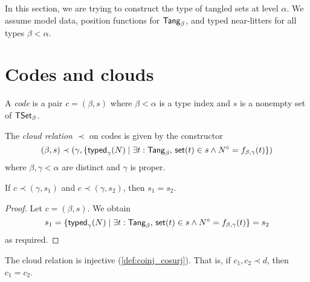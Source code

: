 In this section, we are trying to construct the type of tangled sets at level \( \alpha \).
We assume model data, position functions for \( \mathsf{Tang}_\beta \), and typed near-litters for all types \( \beta < \alpha \).

\section{Codes and clouds}
\begin{definition}[code]
  \label{def:Code}
  A \emph{code} is a pair \( c = (\beta, s) \) where \( \beta < \alpha \) is a type index and \( s \) is a nonempty set of \( \mathsf{TSet}_\beta \).
\end{definition}
\begin{definition}[cloud]
  \label{def:cloud}
  The \emph{cloud relation} \( \prec \) on codes is given by the constructor
  \[ (\beta, s) \prec (\gamma, \{ \operatorname{\mathsf{typed}}_\gamma(N) \mid \exists t : \mathsf{Tang}_\beta,\, \operatorname{\mathsf{set}}(t) \in s \wedge N^\circ = f_{\beta,\gamma}(t) \}) \]
  where \( \beta, \gamma < \alpha \) are distinct and \( \gamma \) is proper.
\end{definition}
\begin{proposition}
  \label{prop:eq_of_cloud}
  If \( c \prec (\gamma, s_1) \) and \( c \prec (\gamma, s_2) \), then \( s_1 = s_2 \).
\end{proposition}
\begin{proof}
  Let \( c = (\beta, s) \).
  We obtain
  \[ s_1 = \{ \operatorname{\mathsf{typed}}_\gamma(N) \mid \exists t : \mathsf{Tang}_\beta,\, \operatorname{\mathsf{set}}(t) \in s \wedge N^\circ = f_{\beta,\gamma}(t) \} = s_2 \]
  as required.
\end{proof}
\begin{proposition}
  \label{prop:cloud_injective}
  The cloud relation is injective (\cref{def:coinj_cosurj}).
  That is, if \( c_1, c_2 \prec d \), then \( c_1 = c_2 \).
\end{proposition}
